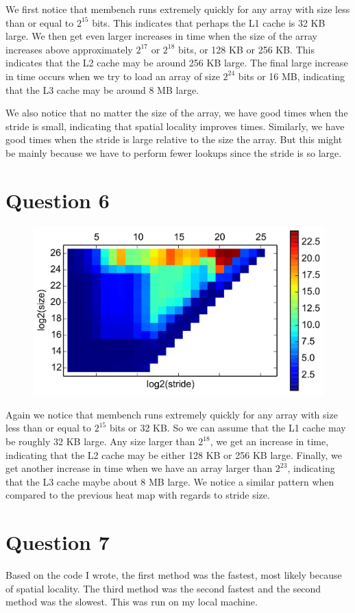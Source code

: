 \documentclass[11pt]{article}
\begin{document}
        We first notice that membench runs extremely quickly for any array with size less than or equal to $2^{15}$ bits. This indicates that perhaps the L1 cache is 32 KB large. We then get even larger increases in time when the size of the array increases above approximately $2^{17}$ or $2^{18}$ bits, or 128 KB or 256 KB. This indicates that the L2 cache may be around 256 KB large. The final large increase in time occurs when we try to load an array of size $2^{24}$ bits or 16 MB, indicating that the L3 cache may be around 8 MB large.

        We also notice that no matter the size of the array, we have good times when the stride is small, indicating that spatial locality improves times. Similarly, we have good times when the stride is large relative to the size the array. But this might be mainly because we have to perform fewer lookups since the stride is so large.

    \section*{Question 6}
        \begin{figure}[H]
            \centering
            \includegraphics[width=5in]{timings-totient/timings-heat.png}
        \end{figure}

        Again we notice that membench runs extremely quickly for any array with size less than or equal to $2^{15}$ bits or 32 KB. So we can assume that the L1 cache may be roughly 32 KB large. Any size larger than $2^{18}$, we get an increase in time, indicating that the L2 cache may be either 128 KB or 256 KB large. Finally, we get another increase in time when we have an array larger than $2^{23}$, indicating that the L3 cache maybe about 8 MB large. We notice a similar pattern when compared to the previous heat map with regards to stride size.

    \section*{Question 7}
        Based on the code I wrote, the first method was the fastest, most likely because of spatial locality. The third method was the second fastest and the second method was the slowest. This was run on my local machine.
\end{document}
